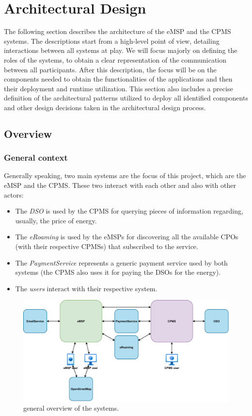 \chapter{Architectural Design} \label{architecture}

The following section describes the architecture of the eMSP and the CPMS systems. The descriptions start from a high-level point of view, detailing interactions between all systems at play. We will focus majorly on defining the roles of the systems, to obtain a clear representation of the communication between all participants. After this description, the focus will be on the components needed to obtain the functionalities of the applications and then their deployment and runtime utilization. This section also includes a precise definition of the architectural patterns utilized to deploy all identified components and other design decisions taken in the architectural design process.

\section{Overview}

\subsection{General context}

Generally speaking, two main systems are the focus of this project, which are the eMSP and the CPMS. These two interact with each other and also with other actors:
\begin{itemize}
    \item The \textit{DSO} is used by the CPMS for querying pieces of information regarding, usually, the price of energy.
    \item The \textit{eRoaming} is used by the eMSPs for discovering all the available CPOs (with their respective CPMSs) that subscribed to the service.
    \item The \textit{PaymentService} represents a generic payment service used by both systems (the CPMS also uses it for paying the DSOs for the energy).
    \item The \textit{users} interact with their respective system.
\end{itemize}

\begin{figure}[h!]
    \centering
    \includegraphics[width=0.97\columnwidth]{./images/overview/general}
    \caption{general overview of the systems.}
\end{figure}

